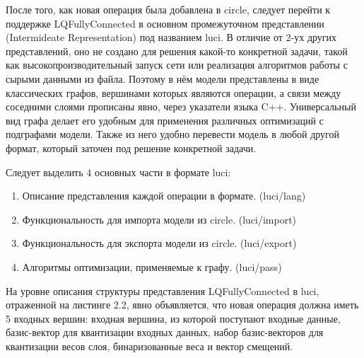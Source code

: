После того, как новая операция была добавлена в circle, следует перейти к поддержке LQFullyConnected в основном промежуточном представлении (Intermideate Representation) под названием luci. В отличие от 2-ух других представлений, оно не создано для решения какой-то конкретной задачи, такой как высокопроизводительный запуск сети или реализация алгоритмов работы с сырыми данными из файла. Поэтому в нём модели представлены в виде классических графов, вершинами которых являются операции, а связи между соседними слоями прописаны явно, через указатели языка C++. Универсальный вид графа делает его удобным для применения различных оптимизаций с подграфами модели. Также из него удобно перевести модель в любой другой формат, который заточен под решение конкретной задачи.

Следует выделить 4 основных части в формате luci:
\begin{enumerate}[label=\arabic*.]
    \item Описание представления каждой операции в формате. (luci/lang)
    \item Функциональность для импорта модели из circle. (luci/import)
    \item Функциональность для экспорта модели из circle. (luci/export)
    \item Алгоритмы оптимизации, применяемые к графу. (luci/pass)
\end{enumerate}

На уровне описания структуры представления LQFullyConnected в luci, отраженной на листинге 2.2, явно объявляется, что новая операция должна иметь 5 входных вершин: входная вершина, из которой поступают входные данные, базис-вектор для квантизации входных данных, набор базис-векторов для квантизации весов слоя, бинаризованные веса и вектор смещений.

